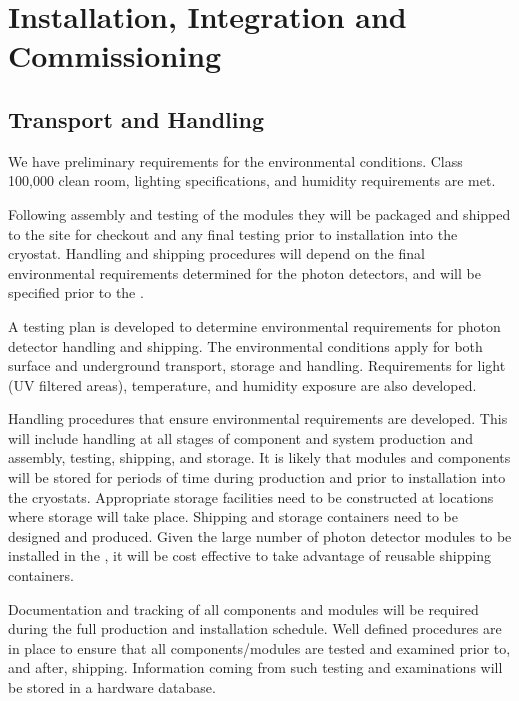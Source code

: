 \section{Installation, Integration and Commissioning}
\label{sec:fdsp-pd-install}


\subsection{Transport and Handling}
\label{sec:fdsp-pd-install-transport}

We have preliminary requirements for the environmental conditions.  Class 100,000 clean room, lighting specifications, and humidity requirements are met. 

Following assembly and testing of the  modules they will be packaged and shipped to the  site for checkout and any final testing prior to installation into the cryostat. Handling and shipping procedures will depend on the final environmental requirements determined for the photon detectors, and will be specified prior to the .

A testing plan is developed to determine environmental requirements for photon detector handling and shipping. The environmental conditions apply for both surface and underground transport, storage and handling. Requirements for light (UV filtered areas), temperature, and humidity exposure are also developed.

Handling procedures that ensure environmental requirements are developed. This will include handling at all stages of component and system production and assembly, testing, shipping, and storage. It is likely that  modules and components will be stored for periods of time during production and prior to installation into the  cryostats. Appropriate storage facilities need to be constructed at locations where storage will take place. Shipping and storage containers need to be designed and produced. Given the large number of photon detector modules to be installed in the , it will be cost effective to take advantage of reusable shipping containers.

Documentation and tracking of all components and  modules will be required during the full production and installation schedule. Well defined procedures are in place to ensure that all components/modules are tested and examined prior to, and after, shipping. Information coming from such testing and examinations will be stored in a hardware database.

